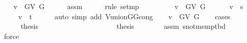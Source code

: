 \begin{isabellebody}
\ \ \isamarkupfalse%
\ {\isachardoublequoteopen}v\ {\isasymin}\ G{\isachardot}{\kern0pt}V\ {\isacharquery}{\kern0pt}G{\isachardoublequoteclose}\isanewline
\ \ \ \ \isamarkupfalse%
\ assm\isanewline
\ \ \ \ \isamarkupfalse%
\ {\isacharparenleft}{\kern0pt}rule\ set{\isacharunderscore}{\kern0pt}mp{\isacharparenright}{\kern0pt}\isanewline
\ \ \isamarkupfalse%
\ \isamarkupfalse%
\isanewline
\ \ \ \ {\isacharparenleft}{\kern0pt}{}{\isacharparenright}{\kern0pt}\ {\isachardoublequoteopen}v\ {\isasymin}\ G{\isachardot}{\kern0pt}V\ G{\isachardoublequoteclose}\ {\isacharbar}{\kern0pt}\isanewline
\ \ \ \ {\isacharparenleft}{\kern0pt}{}{\isacharparenright}{\kern0pt}\ {\isachardoublequoteopen}v\ {\isasymin}\ {\isacharbraceleft}{\kern0pt}s{\isacharbraceright}{\kern0pt}{\isachardoublequoteclose}\ {\isacharbar}{\kern0pt}\isanewline
\ \ \ \ {\isacharparenleft}{\kern0pt}{}{\isacharparenright}{\kern0pt}\ {\isachardoublequoteopen}v\ {\isasymin}\ {\isacharbraceleft}{\kern0pt}t{\isacharbraceright}{\kern0pt}{\isachardoublequoteclose}\isanewline
\ \ \ \ \isamarkupfalse%
\ {\isacharparenleft}{\kern0pt}auto\ simp\ add{\isacharcolon}{\kern0pt}\ V{\isacharunderscore}{\kern0pt}union{\isacharunderscore}{\kern0pt}G{}{\isacharunderscore}{\kern0pt}G{}{\isacharunderscore}{\kern0pt}cong{\isacharparenright}{\kern0pt}\isanewline
\ \ \isamarkupfalse%
\ {\isachardoublequoteopen}v\ {\isasymin}\ G{\isachardot}{\kern0pt}V\ G{\isachardoublequoteclose}\isanewline
\ \ \isamarkupfalse%
\ {\isacharparenleft}{\kern0pt}cases{\isacharparenright}{\kern0pt}\isanewline
\ \ \ \ \isamarkupfalse%
\ {}\isanewline
\ \ \ \ \isamarkupfalse%
\ {\isacharquery}{\kern0pt}thesis\isanewline
\ \ \ \ \ \ \isacommand{{\isachardot}{\kern0pt}}\isamarkupfalse%
\isanewline
\ \ \isamarkupfalse%
\isanewline
\ \ \ \ \isamarkupfalse%
\ {}\isanewline
\ \ \ \ \isamarkupfalse%
\ {\isacharquery}{\kern0pt}thesis\isanewline
\ \ \ \ \ \ \isamarkupfalse%
\ assm\ s{\isacharunderscore}{\kern0pt}not{\isacharunderscore}{\kern0pt}mem{\isacharunderscore}{\kern0pt}p{\isacharunderscore}{\kern0pt}tbd\isanewline
\ \ \ \ \ \ \isamarkupfalse%
\ force\isanewline
\ \ \isamarkupfalse%
\isanewline
\ \ \ \ \isamarkupfalse%
\ {}\isanewline
\ \ \ \ \isamarkupfalse%

\end{isabellebody}
